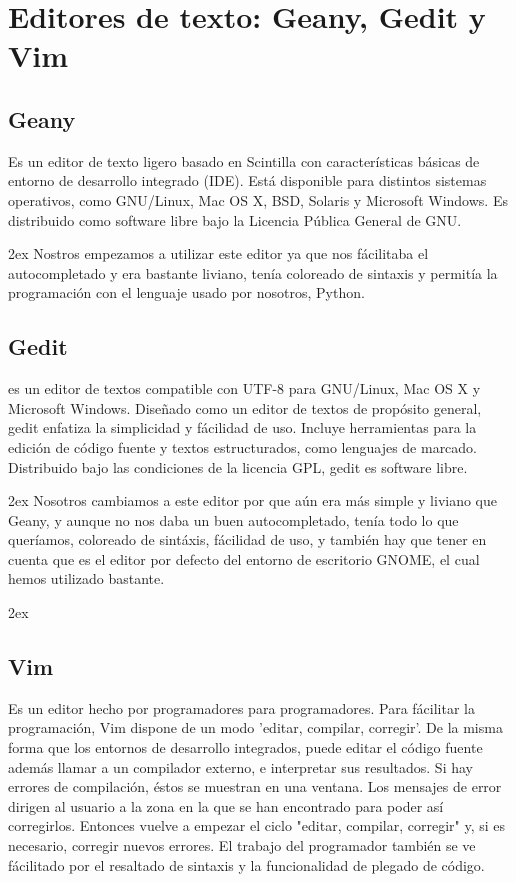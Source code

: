 \documentclass[12pt,a4paper]{report}
\begin{document}
\section{Editores de texto: Geany, Gedit y Vim}

\subsection{Geany} 

Es un editor de texto ligero basado en Scintilla con características básicas de
entorno de desarrollo integrado (IDE). Está disponible para distintos sistemas
operativos, como GNU/Linux, Mac OS X, BSD, Solaris y Microsoft Windows.  Es
distribuido como software libre bajo la Licencia Pública General de GNU.

\parskip 2ex
Nostros empezamos a utilizar este editor ya que nos fácilitaba el autocompletado
y era bastante liviano, tenía coloreado de sintaxis y permitía la programación
con el lenguaje usado por nosotros, Python. 

\subsection{Gedit}

es un editor de textos compatible con UTF-8 para GNU/Linux, Mac OS X y Microsoft
Windows. Diseñado como un editor de textos de propósito general, gedit enfatiza
la simplicidad y fácilidad de uso. Incluye herramientas para la edición de
código fuente y textos estructurados, como lenguajes de marcado. Distribuido
bajo las condiciones de la licencia GPL, gedit es software libre. 

\parskip 2ex
Nosotros cambiamos a este editor por que aún era más simple y liviano que Geany,
y aunque no nos daba un buen autocompletado, tenía todo lo que queríamos,
coloreado de sintáxis, fácilidad de uso, y también hay que tener en cuenta que
es el editor por defecto del entorno de escritorio GNOME, el cual hemos
utilizado bastante. 

\parskip 2ex

\subsection{Vim}

Es un editor hecho por programadores para programadores. Para fácilitar la
programación, Vim dispone de un modo 'editar, compilar, corregir'.  De la misma
forma que los entornos de desarrollo integrados, puede editar el código fuente
además llamar a un compilador externo, e interpretar sus resultados. Si hay
errores de compilación, éstos se muestran en una ventana. Los mensajes de error
dirigen al usuario a la zona en la que se han encontrado para poder así
corregirlos. Entonces vuelve a empezar el ciclo "editar, compilar, corregir" y,
si es necesario, corregir nuevos errores. El trabajo del programador también se
ve fácilitado por el resaltado de sintaxis y la funcionalidad de plegado de
código.
\end{document}
